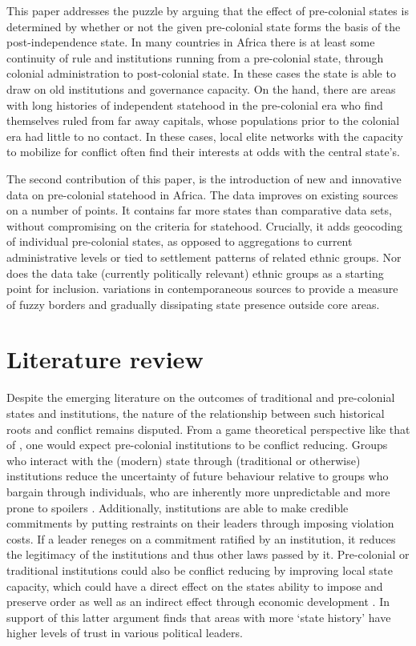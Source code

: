 \documentclass[12pt]{article}
\begin{document}
This paper addresses the puzzle by arguing that the effect of pre-colonial
states is determined by whether or not the given pre-colonial state forms the
basis of the post-independence state. In many countries in Africa there is at
least some continuity of rule and institutions running from a pre-colonial
state, through colonial administration to post-colonial state. In these cases
the state is able to draw on old institutions and governance capacity. On the
hand, there are areas with long histories of independent statehood in the
pre-colonial era who find themselves ruled from far away capitals, whose
populations prior to the colonial era had little to no contact. In these cases,
local elite networks with the capacity to mobilize for conflict often find their
interests at odds with the central state's.

The second contribution of this paper, is the introduction of new and innovative
data on pre-colonial statehood in Africa. The data improves on existing sources
on a number of points. It contains far more states than comparative data sets,
without compromising on the criteria for statehood. Crucially, it adds geocoding
of individual pre-colonial states, as opposed to aggregations to current
administrative levels or tied to settlement patterns of related ethnic groups.
Nor does the data take (currently politically relevant) ethnic groups as a
starting point for inclusion. %
variations in contemporaneous sources to provide a measure of fuzzy borders and
gradually dissipating state presence outside core areas.

\section{Literature review} 

Despite the emerging literature on the outcomes of traditional and pre-colonial
states and institutions, the nature of the relationship between such historical
roots and conflict remains disputed. From a game theoretical perspective like
that of \citet{Fearon1995}, one would expect pre-colonial institutions to be
conflict reducing. Groups who interact with the (modern) state through
(traditional or otherwise) institutions reduce the uncertainty of future
behaviour relative to groups who bargain through individuals, who are inherently
more unpredictable and more prone to spoilers \citep{Wig2016}. Additionally,
institutions are able to make credible commitments by putting restraints on
their leaders through imposing violation costs. If a leader reneges on a
commitment ratified by an institution, it reduces the legitimacy of the
institutions and thus other laws passed by it. Pre-colonial or traditional
institutions could also be conflict reducing by improving local state capacity,
which could have a direct effect on the states ability to impose and preserve
order as well as an indirect effect through economic development
\citep{Depetris-Chauvin2016}. In support of this latter argument
\citet{Depetris-Chauvin2016} finds that areas with more `state history' have
higher levels of trust in various political leaders.
\end{document}
